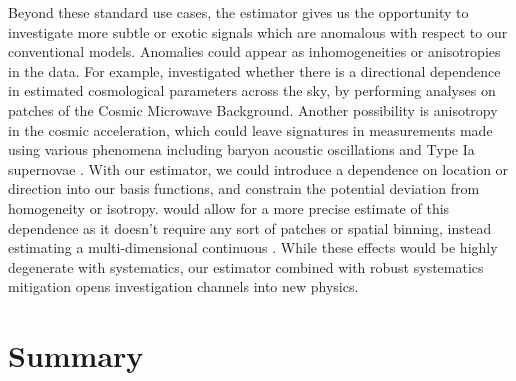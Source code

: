 Beyond these standard use cases, the estimator gives us the opportunity to investigate more subtle or exotic signals which are anomalous with respect to our conventional models.
Anomalies could appear as inhomogeneities or anisotropies in the data.
For example, \cite{MukherjeeWandelt2018} investigated whether there is a directional dependence in estimated cosmological parameters across the sky, by performing analyses on patches of the Cosmic Microwave Background.
Another possibility is anisotropy in the cosmic acceleration, which could leave signatures in measurements made using various phenomena including baryon acoustic oscillations \citep{Faltenbacher2012} and Type Ia supernovae \citep{Colin2019}.
With our estimator, we could introduce a dependence on location or direction into our basis functions, and constrain the potential deviation from homogeneity or isotropy.
\Est would allow for a more precise estimate of this dependence as it doesn't require any sort of patches or spatial binning, instead estimating a multi-dimensional continuous \cf.
While these effects would be highly degenerate with systematics, our estimator combined with robust systematics mitigation opens investigation channels into new physics.


\section{Summary}
\label{sec:summary_cfe}

